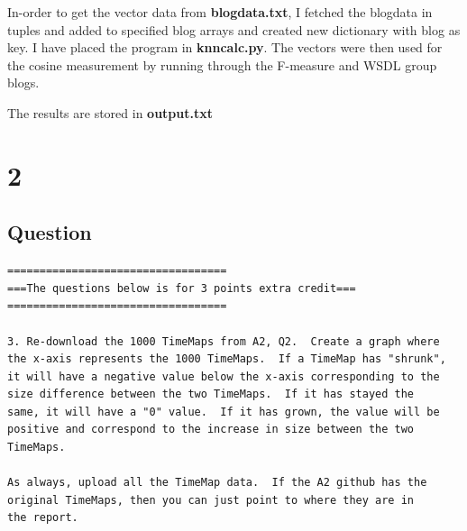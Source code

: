 \documentclass[letterpaper,11pt]{article}
\begin{document}


In-order to get the vector data from \textbf{blogdata.txt}, I fetched the blogdata in tuples and added to specified blog arrays and created new dictionary with blog as key. I have placed the program in \textbf{knncalc.py}. The vectors were then used for the cosine measurement by running through the F-measure and WSDL group blogs.



\clearpage

The results are stored in \textbf{output.txt}
 



\clearpage



\section*{2}

\subsection*{Question}

\begin{verbatim}
==================================
===The questions below is for 3 points extra credit===
==================================

3. Re-download the 1000 TimeMaps from A2, Q2.  Create a graph where
the x-axis represents the 1000 TimeMaps.  If a TimeMap has "shrunk",
it will have a negative value below the x-axis corresponding to the
size difference between the two TimeMaps.  If it has stayed the
same, it will have a "0" value.  If it has grown, the value will be 
positive and correspond to the increase in size between the two
TimeMaps.

As always, upload all the TimeMap data.  If the A2 github has the 
original TimeMaps, then you can just point to where they are in 
the report.\end{verbatim}
\end{document}

